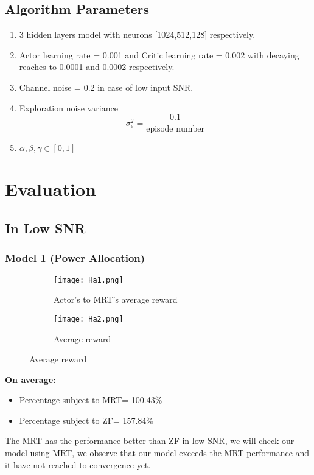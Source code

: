 \subsection{Algorithm Parameters}
\begin{enumerate}
    \item 3 hidden layers model with neurons [1024,512,128] respectively.
    \item Actor learning rate = 0.001 and Critic learning rate = 0.002 with decaying reaches to 0.0001 and 0.0002 respectively.
    \item Channel noise = 0.2 in case of low input SNR.
    \item Exploration noise variance \[ \sigma^2_\epsilon = \frac{0.1}{\text{episode number}} \]
    \item $\alpha, \beta, \gamma \in [0,1]$
\end{enumerate}

\section{Evaluation}
\subsection{In Low SNR}
\subsubsection{Model 1 (Power Allocation)}
\begin{figure}[H]
    \centering
    \begin{subfigure}{.5\textwidth}
      \centering
      \texttt{[image: Ha1.png]}
      \caption{Actor's to MRT's average reward}
      \label{fig:lowSNR Model1}
    \end{subfigure}%
    \begin{subfigure}{.5\textwidth}
      \centering
      \texttt{[image: Ha2.png]}
      \caption{Average reward}
      \label{fig:lowSNR Model1_1}
    \end{subfigure}
\end{figure}
\textbf{On average:}
\begin{itemize}
    \item Percentage subject to MRT= 100.43\%
    \item Percentage subject to ZF= 157.84\%
\end{itemize}
The MRT has the performance better than ZF in low SNR, we will check our model using MRT, we observe that our model exceeds the MRT performance and it have not reached to convergence yet.

